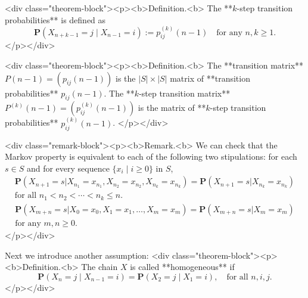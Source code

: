
<div class="theorem-block"><p><b>Definition.<b> 
The **$k$-step transition probabilities** is defined as
$$$$$$$$\begin{equation}
    \label{eq:7.2}
    \tag{7-2}
    \mathbf{P}(X_{n+k-1} = j \;\vert\; X_{n-1} = i) := p_{ij}^{(k)}(n-1) \quad \text{for any } n, k \geq 1.
\end{equation}$$$$$$$$
</p></div>

<div class="theorem-block"><p><b>Definition.<b> 
The **transition matrix** $P(n-1) = (p_{ij}(n-1))$ is the $\left\vert S \right\vert \times \left\vert S \right\vert$ matrix of **transition probabilities** $p_{ij}(n-1)$. The **$k$-step transition matrix** $P^{(k)}(n-1) = (p_{ij}^{(k)}(n-1))$ is the matrix of **$k$-step transition probabilities** $p_{ij}^{(k)}(n-1)$.
</p></div>

<div class="remark-block"><p><b>Remark.<b> 
We can check that the Markov property is equivalent to each of the following two stipulations: for each $s \in S$ and for every sequence $\{ x_i \;\vert\; i \geq 0\}$ in $S$,
$$$$$$$$\begin{equation}
    \label{eq:7.3a}
    \tag{7-3a}
    \begin{split}
        \mathbf{P}\left(X_{n+1}=s | X_{n_{1}}=x_{n_{1}}, X_{n_{2}}=x_{n_{2}}, X_{n_{k}}=x_{n_{k}}\right)=\mathbf{P}\left(X_{n+1}=s | X_{n_{k}}=x_{n_{k}}\right) \\
        \text{for all } n_1 < n_2 < \cdots < n_k \leq n.
    \end{split}
\end{equation}$$$$$$$$
$$$$$$$$\begin{equation}
    \label{eq:7.3b}
    \tag{7-3b}
    \begin{split}
        \mathbf{P}\left(X_{m+n}=s | X_{0}=x_{0}, X_{1}=x_{1}, \ldots, X_{m}=x_{m}\right)=\mathbf{P}\left(X_{m+n}=s | X_{m}=x_{m}\right) \\ 
        \text{for any } m, n \geq 0.
    \end{split}
\end{equation}$$$$$$$$
</p></div>

Next we introduce another assumption:
<div class="theorem-block"><p><b>Definition.<b> 
The chain $X$ is called **homogeneous** if
$$\begin{equation}
    \mathbf{P}(X_n = j \;\vert\; X_{n-1} = i) = \mathbf{P}(X_2 = j \;\vert\; X_1 = i), \quad \text{for all } n, i, j.
\end{equation}$$
</p></div>

